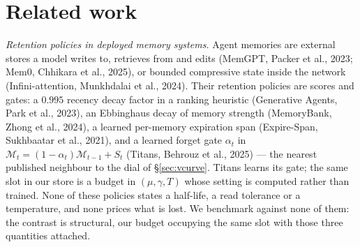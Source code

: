 \documentclass{article}
\begin{document}
\section{Related work}\label{sec:related}

{\emph{Retention policies in deployed memory systems.} Agent memories are external stores a model writes to, retrieves from and edits (MemGPT, Packer et al., 2023; Mem0, Chhikara et al., 2025), or bounded compressive state inside the network (Infini-attention, Munkhdalai et al., 2024). Their retention policies are scores and gates: a $0.995$ recency decay factor in a ranking heuristic (Generative Agents, Park et al., 2023), an Ebbinghaus decay of memory strength (MemoryBank, Zhong et al., 2024), a learned per-memory expiration span (Expire-Span, Sukhbaatar et al., 2021), and a learned forget gate $\alpha_t$ in $\mathcal M_t=(1-\alpha_t)\mathcal M_{t-1}+S_t$ (Titans, Behrouz et al., 2025) --- the nearest published neighbour to the dial of \S\ref{sec:vcurve}. Titans learns its gate; the same slot in our store is a budget in $(\mu,\gamma,T)$ whose setting is computed rather than trained. None of these policies states a half-life, a read tolerance or a temperature, and none prices what is lost. We benchmark against none of them: the contrast is structural, our budget occupying the same slot with those three quantities attached.

}
\end{document}
